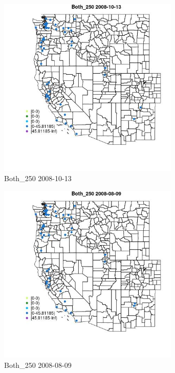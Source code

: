 \begin{figure} 
\centering  
\includegraphics[width=0.77\textwidth]{Code_Outputs/Report_ML_input_PM25_Step4_part_e_de_duplicated_aves_MapObsBoth_2502008-10-13.jpg} 
\caption{\label{fig:Report_ML_input_PM25_Step4_part_e_de_duplicated_avesMapObsBoth_2502008-10-13}Both_250 2008-10-13} 
\end{figure} 
 

\begin{figure} 
\centering  
\includegraphics[width=0.77\textwidth]{Code_Outputs/Report_ML_input_PM25_Step4_part_e_de_duplicated_aves_MapObsBoth_2502008-08-09.jpg} 
\caption{\label{fig:Report_ML_input_PM25_Step4_part_e_de_duplicated_avesMapObsBoth_2502008-08-09}Both_250 2008-08-09} 
\end{figure} 
 

